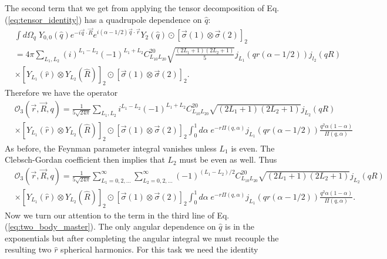 \documentclass[12pt,letterpaper]{book}
\begin{document}
The second term that we get from applying the tensor decomposition of Eq. (\ref{eq:tensor_identity}) has a quadrupole dependence on $\hat{q}$:
\begin{equation}
\begin{split}
&\int d\Omega_q\;Y_{0,0}(\hat{q})e^{-i\vec{q}\cdot\vec{R}}e^{i(\alpha-1/2)\vec{q}\cdot\vec{r}}Y_2(\hat{q})\odot\left[\vec{\sigma}(1)\otimes\vec{\sigma}(2)\right]_2\\
&=4\pi\sum_{L_1,L_2}(i)^{L_1-L_2}(-1)^{L_1+L_2}C^{20}_{L_10L_20}\sqrt{\frac{(2L_1+1)(2L_2+1)}{5}}j_{L_1}\left(q r(\alpha-1/2)\right)j_{l_2}(q R)\\
&\times\left[Y_{L_1}(\hat{r})\otimes Y_{L_2}(\hat{R})\right]_2\odot\left[\vec{\sigma}(1)\otimes\vec{\sigma}(2)\right]_2.
\end{split}
\end{equation}
Therefore we have the operator
\begin{equation}
\begin{split}
&\mathcal{O}_3(\vec{r},\vec{R},q)=\frac{1}{5\sqrt{24\pi}}\sum_{L_1,L_2}i^{L_1-L_2}(-1)^{L_1+L_2}C_{L_10L_20}^{20}\sqrt{(2L_1+1)(2L_2+1)}j_{L_2}(q R)\\
&\times\left[Y_{L_1}(\hat{r})\otimes Y_{L_2}(\hat{R})\right]_2\odot\left[\vec{\sigma}(1)\otimes\vec{\sigma}(2)\right]_2\int_0^1d\alpha\;e^{-r\Pi(q,\alpha)}j_{L_1}\left(q r(\alpha-1/2)\right)\frac{q^2\alpha(1-\alpha)}{\Pi(q,\alpha)}
\end{split}
\end{equation}
As before, the Feynman parameter integral vanishes unless $L_1$ is even. The Clebsch-Gordan coefficient then implies that $L_2$ must be even as well. Thus
\begin{equation}
\begin{split}
&\mathcal{O}_3(\vec{r},\vec{R},q)=\frac{1}{5\sqrt{24\pi}}\sum_{L_1=0,2,...}^{\infty}\sum_{L_2=0,2,...}^{\infty}(-1)^{(L_1-L_2)/2}C_{L_10L_20}^{20}\sqrt{(2L_1+1)(2L_2+1)}j_{L_2}(q R)\\
&\times \left[Y_{L_1}(\hat{r})\otimes Y_{L_2}(\hat{R})\right]_2\odot\left[\vec{\sigma}(1)\otimes\vec{\sigma}(2)\right]_2\int_0^1d\alpha\;e^{-r\Pi(q,\alpha)}j_{L_1}\left(q r(\alpha-1/2)\right)\frac{q^2\alpha(1-\alpha)}{\Pi(q,\alpha)}.
\end{split}
\end{equation}
Now we turn our attention to the term in the third line of Eq. (\ref{eq:two_body_master}). The only angular dependence on $\hat{q}$ is in the exponentials but after completing the angular integral we must recouple the resulting two $\hat{r}$ spherical harmonics. For this task we need the identity
\end{document}
